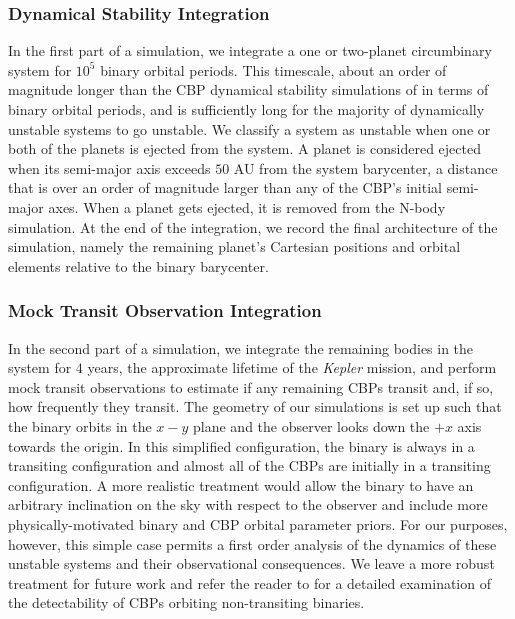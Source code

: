 \subsubsection{Dynamical Stability Integration}

In the first part of a simulation, we integrate a one or two-planet circumbinary system for $10^5$ binary orbital periods.  This timescale, about an order of magnitude longer than the CBP dynamical stability simulations of \citet{Holman1999} in terms of binary orbital periods, and is sufficiently long for the majority of dynamically unstable systems to go unstable.  We classify a system as unstable when one or both of the planets is ejected from the system.  A planet is considered ejected when its semi-major axis exceeds $50$ AU from the system barycenter, a distance that is over an order of magnitude larger than any of the CBP's initial semi-major axes.  When a planet gets ejected, it is removed from the N-body simulation.  At the end of the integration, we record the final architecture of the simulation, namely the remaining planet's Cartesian positions and orbital elements relative to the binary barycenter.  

\subsubsection{Mock Transit Observation Integration}

In the second part of a simulation, we integrate the remaining bodies in the system for $4$ years, the approximate lifetime of the \textit{Kepler} mission, and perform mock transit observations to estimate if any remaining CBPs transit and, if so, how frequently they transit.  The geometry of our simulations is set up such that the binary orbits in the $x-y$ plane and the observer looks down the $+x$ axis towards the origin.  In this simplified configuration, the binary is always in a transiting configuration and almost all of the CBPs are initially in a transiting configuration.  A more realistic treatment would allow the binary to have an arbitrary inclination on the sky with respect to the observer and include more physically-motivated binary and CBP orbital parameter priors.  For our purposes, however, this simple case permits a first order analysis of the dynamics of these unstable systems and their observational consequences. We leave a more robust treatment for future work and refer the reader to \citet{Martin2014} for a detailed examination of the detectability of CBPs orbiting non-transiting binaries.

